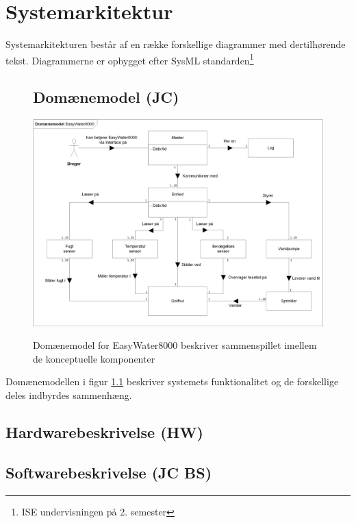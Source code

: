 \chapter{Systemarkitektur}
Systemarkitekturen består af en række forskellige diagrammer med dertilhørende tekst. Diagrammerne er opbygget efter SysML standarden\footnote{ISE undervisningen på 2. semester}

\begin{figure}[htbp] \centering
\section{Domænemodel (JC)}
{\includegraphics[width=\textwidth]{filer/systemarkitektur/Domainmodel}}
\caption{Domænemodel for EasyWater8000 beskriver sammenspillet imellem de konceptuelle komponenter}
\label{lab:domainmodel}
\end{figure}
Domænemodellen i figur \ref{lab:domainmodel} beskriver systemets funktionalitet og de forskellige deles indbyrdes sammenhæng. 

\newpage
\section{Hardwarebeskrivelse (HW)}


\clearpage
\section{Softwarebeskrivelse (JC BS)}
